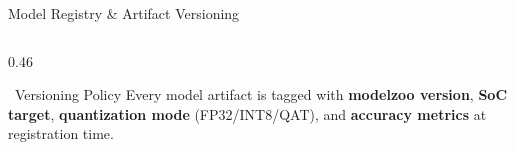 \documentclass[aspectratio=169,12pt]{beamer}
\begin{document}
\begin{frame}{Model Registry \& Artifact Versioning}
\begin{columns}[T]
\begin{column}{0.46\textwidth}

      \vspace{0.2cm}
      \begin{alertblock}{\scriptsize \faShieldAlt~Versioning Policy}
        \scriptsize Every model artifact is tagged with \textbf{modelzoo version},
        \textbf{SoC target}, \textbf{quantization mode} (FP32/INT8/QAT),
        and \textbf{accuracy metrics} at registration time.
      \end{alertblock}
    \end{column}
  \end{columns}
\end{frame}
\end{document}
